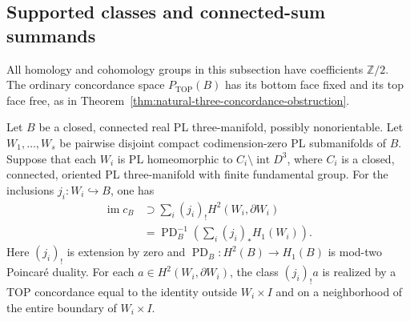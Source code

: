 \subsection{Supported classes and connected-sum summands}

All homology and cohomology groups in this subsection have
coefficients $\mathbb Z/2$.  The ordinary concordance space
$P_{\mathrm{TOP}}(B)$ has its bottom face fixed and its top
face free, as in
Theorem~\ref{thm:natural-three-concordance-obstruction}.

\begin{theorem}\label{thm:supported-three-concordance-realization}
Let $B$ be a closed, connected real PL three-manifold, possibly
nonorientable.  Let $W_1,\ldots,W_s$ be pairwise disjoint compact
codimension-zero PL submanifolds of $B$.  Suppose that each
$W_i$ is PL homeomorphic to
$C_i\setminus\operatorname{int}D^3$, where $C_i$ is a closed,
connected, oriented PL three-manifold with finite fundamental
group.  For the inclusions $j_i:W_i\hookrightarrow B$, one has
\begin{equation}\label{eq:supported-three-image}
 \begin{split}
 \operatorname{im}c_B
   &\supset\sum_i(j_i)_!H^2(W_i,\partial W_i)\\
   &=\operatorname{PD}_B^{-1}
       \left(\sum_i(j_i)_*H_1(W_i)\right).
 \end{split}
\end{equation}
Here $(j_i)_!$ is extension by zero and
$\operatorname{PD}_B:H^2(B)\to H_1(B)$ is mod-two
Poincar\'e duality.  For each $a\in H^2(W_i,\partial W_i)$,
the class $(j_i)_!a$ is realized by a TOP concordance equal
to the identity outside $W_i\times I$ and on a neighborhood
of the entire boundary of $W_i\times I$.
\end{theorem}


